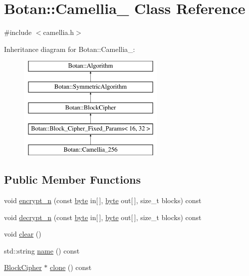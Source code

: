 \hypertarget{classBotan_1_1Camellia__256}{\section{Botan\-:\-:Camellia\-\_ Class Reference}
\label{classBotan_1_1Camellia__256}
}


{\ttfamily \#include $<$camellia.\-h$>$}

Inheritance diagram for Botan\-:\-:Camellia\-\_\-:\begin{figure}[H]
\begin{center}
\leavevmode
\includegraphics[height=5.000000cm]{classBotan_1_1Camellia__256}
\end{center}
\end{figure}
\subsection*{Public Member Functions}
\begin{DoxyCompactItemize}
\item 
void \hyperlink{classBotan_1_1Camellia__256_ad8ef9d0e4f388bce635145abc6a64000}{encrypt\-\_\-n} (const \hyperlink{namespaceBotan_a7d793989d801281df48c6b19616b8b84}{byte} in\mbox{[}$\,$\mbox{]}, \hyperlink{namespaceBotan_a7d793989d801281df48c6b19616b8b84}{byte} out\mbox{[}$\,$\mbox{]}, size\-\_\-t blocks) const 
\item 
void \hyperlink{classBotan_1_1Camellia__256_ab582fd5c2c15dda5a0a3e89896de03f4}{decrypt\-\_\-n} (const \hyperlink{namespaceBotan_a7d793989d801281df48c6b19616b8b84}{byte} in\mbox{[}$\,$\mbox{]}, \hyperlink{namespaceBotan_a7d793989d801281df48c6b19616b8b84}{byte} out\mbox{[}$\,$\mbox{]}, size\-\_\-t blocks) const 
\item 
void \hyperlink{classBotan_1_1Camellia__256_a492597356ab20204baa6d48e61c0fc46}{clear} ()
\item 
std\-::string \hyperlink{classBotan_1_1Camellia__256_afa7afa3b1142295e86bb4a56793f0424}{name} () const 
\item 
\hyperlink{classBotan_1_1BlockCipher}{Block\-Cipher} $\ast$ \hyperlink{classBotan_1_1Camellia__256_a416763e7bfc8c2df73ac6f8ae5f6ca46}{clone} () const 
\end{DoxyCompactItemize}
